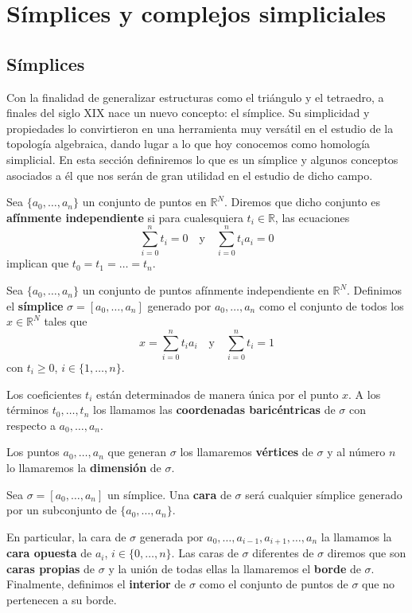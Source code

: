 
\chapter{Símplices y complejos simpliciales}

\section{Símplices}

Con la finalidad de generalizar estructuras como el triángulo y el tetraedro, 
a finales del siglo XIX nace un nuevo concepto: el símplice. Su simplicidad y 
propiedades lo convirtieron en una herramienta muy versátil en el estudio de la
topología algebraica, dando lugar a lo que hoy conocemos como homología simplicial. 
En esta sección definiremos lo que es un símplice y algunos conceptos asociados a él
que nos serán de gran utilidad en el estudio de dicho campo.

\begin{definicion}
	Sea $\{a_0, \dots, a_n\}$ un conjunto de puntos en $\mathbb{R}^N$. 
	Diremos que dicho conjunto es \textbf{afínmente independiente} si 
	para cualesquiera $t_i \in \mathbb{R}$, las ecuaciones
	\[ \sum_{i=0}^{n}t_i=0 \quad \text{y} \quad \sum_{i=0}^{n}t_ia_i=0 \]
	implican que $t_0 = t_1 = \dots = t_n$.
\end{definicion}

\begin{definicion}
	Sea $\{a_0, \dots, a_n\}$ un conjunto de puntos afínmente independiente en 
	$\mathbb{R}^N$. Definimos el \textbf{símplice} $\sigma = [a_0, \dots, a_n]$ 
	generado por $a_0, 	\dots, a_n$ como el conjunto de todos los $x \in \mathbb{R}^N$ 
	tales que
	\[ x=\sum_{i=0}^{n}t_ia_i \quad \text{y} \quad \sum_{i=0}^{n}t_i=1 \]
	con $t_i \geq 0$, $i \in \{1, \dots, n\}$.
\end{definicion}
Los coeficientes $t_i$ están determinados de manera única por el punto $x$. A los términos  
$t_0, \dots, t_n$ los llamamos las \textbf{coordenadas baricéntricas} de $\sigma$
con respecto a $a_0, \dots, a_n$.

Los puntos $a_0, \dots, a_n$ que generan $\sigma$ los llamaremos \textbf{vértices} de $\sigma$
y al número $n$ lo llamaremos la \textbf{dimensión} de $\sigma$.

\begin{definicion}
	Sea $\sigma=[a_0, \dots, a_n]$ un símplice. Una \textbf{cara} de $\sigma$ será cualquier
	símplice generado por un subconjunto de $\{a_0, \dots, a_n\}$.
\end{definicion}
En particular, la cara de $\sigma$ generada por $a_0, \dots, a_{i-1}, a_{i+1}, \dots, a_n$ la 
llamamos la \textbf{cara opuesta} de $a_i$, $i \in \{0, \dots, n\}$. Las caras de $\sigma$ 
diferentes de $\sigma$ diremos que son \textbf{caras propias} de $\sigma$ y la unión de todas ellas la 
llamaremos el \textbf{borde} de $\sigma$. Finalmente, definimos el \textbf{interior} de $\sigma$
como el conjunto de puntos de $\sigma$ que no pertenecen a su borde.

